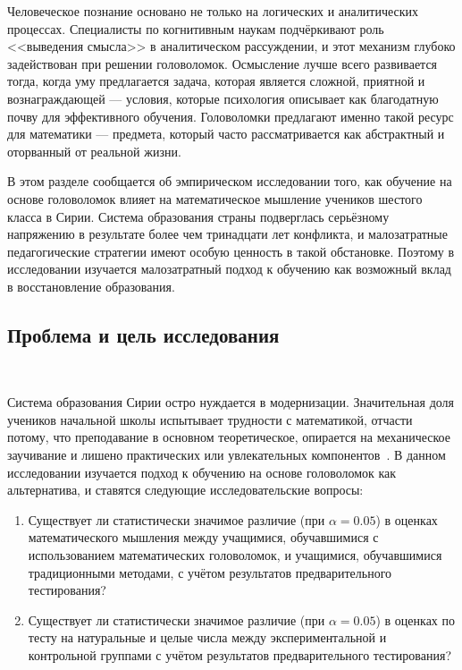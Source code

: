 \documentclass[a4paper,14pt]{extreport}
\theoremstyle{plain}
\theoremstyle{definition}
\theoremstyle{remark}
\begin{document}
Человеческое познание основано не только на логических и аналитических процессах. Специалисты по когнитивным наукам подчёркивают роль <<выведения смысла>> в аналитическом рассуждении, и этот механизм глубоко задействован при решении головоломок. Осмысление лучше всего развивается тогда, когда уму предлагается задача, которая является сложной, приятной и вознаграждающей --- условия, которые психология описывает как благодатную почву для эффективного обучения. Головоломки предлагают именно такой ресурс для математики --- предмета, который часто рассматривается как абстрактный и оторванный от реальной жизни.

В этом разделе сообщается об эмпирическом исследовании того, как обучение на основе головоломок влияет на математическое мышление учеников шестого класса в Сирии. Система образования страны подверглась серьёзному напряжению в результате более чем тринадцати лет конфликта, и малозатратные педагогические стратегии имеют особую ценность в такой обстановке. Поэтому в исследовании изучается малозатратный подход к обучению как возможный вклад в восстановление образования.

\subsection*{Проблема и цель исследования}~\label{sec4.3.1}

Система образования Сирии остро нуждается в модернизации. Значительная доля учеников начальной школы испытывает трудности с математикой, отчасти потому, что преподавание в основном теоретическое, опирается на механическое заучивание и лишено практических или увлекательных компонентов~\cite{Duaa}. В данном исследовании изучается подход к обучению на основе головоломок как альтернатива, и ставятся следующие исследовательские вопросы:

\begin{enumerate}
	\item Существует ли статистически значимое различие (при $\alpha = 0.05$) в оценках математического мышления между учащимися, обучавшимися с использованием математических головоломок, и учащимися, обучавшимися традиционными методами, с учётом результатов предварительного тестирования?
	\item Существует ли статистически значимое различие (при $\alpha = 0.05$) в оценках по тесту на натуральные и целые числа между экспериментальной и контрольной группами с учётом результатов предварительного тестирования? 
\end{enumerate}
\end{document}

